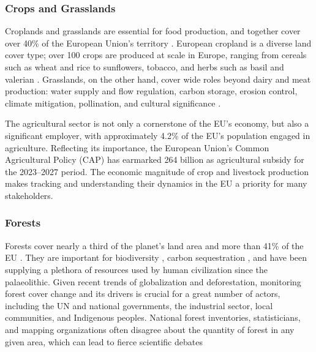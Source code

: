     \subsubsection{Crops and Grasslands}

        Croplands and grasslands are essential for food production, and together cover over 40\% of the European Union's territory \citep{eurostat2021land}. European cropland is a diverse land cover type; over 100 crops are produced at scale in Europe, ranging from cereals such as wheat and rice to sunflowers, tobacco, and herbs such as basil and valerian \citep{eurostat2023agricultural}. Grasslands, on the other hand, cover wide roles beyond dairy and meat production: water supply and flow regulation, carbon storage, erosion control, climate mitigation, pollination, and cultural significance \citep{bengtsson2019grasslands}. 
        
        The agricultural sector is not only a cornerstone of the EU's economy, but also a significant employer, with approximately 4.2\% of the EU's population engaged in agriculture. Reflecting its importance, the European Union's Common Agricultural Policy (CAP) has earmarked {\texteuro}264 billion as agricultural subsidy for the 2023--2027 period. The economic magnitude of crop and livestock production makes tracking and understanding their dynamics in the EU a priority for many stakeholders.

    \subsubsection{Forests}

        Forests cover nearly a third of the planet's land area \citep{fao2022,banskota2014forest} and more than 41\% of the EU \citep{eurostat2021land}. They are important for biodiversity \citep{cazzolla2022number}, carbon sequestration \citep{ipcc2021}, and have been supplying a plethora of resources used by human civilization since the palaeolithic. Given recent trends of globalization and deforestation, monitoring forest cover change and its drivers is crucial \citep{sy2019tropical,masolele2024mapping} for a great number of actors, including the UN and national governments, the industrial sector, local communities, and Indigenous peoples. National forest inventories, statisticians, and mapping organizations often disagree about the quantity of forest in any given area, which can lead to fierce scientific debates \citep{picard2021recent, korhonen2020new, palahi2021concerns, rossi2019assessing}
    
